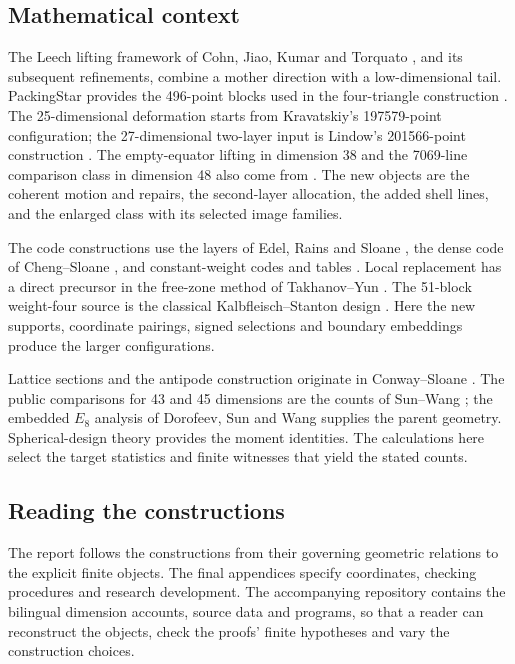 \subsection{Mathematical context}

The Leech lifting framework of Cohn, Jiao, Kumar and Torquato
\cite[Theorem 7.5]{cjkt}, and its subsequent refinements, combine a
mother direction with a low-dimensional tail. PackingStar provides
the 496-point blocks used in the four-triangle construction
\cite{packingstar,packingstar-data}. The 25-dimensional deformation
starts from Kravatskiy's 197579-point configuration; the 27-dimensional
two-layer input is Lindow's 201566-point construction
\cite{kissingnumbers,lindow27}. The empty-equator lifting in dimension 38
and the 7069-line comparison class in dimension 48 also come
from \cite{kissingnumbers}. The new objects are the coherent motion
and repairs, the second-layer allocation, the added shell lines,
and the enlarged class with its selected image families.

The code constructions use the layers of Edel, Rains and Sloane
\cite{ers}, the dense code of Cheng--Sloane \cite{chengsloane}, and
constant-weight codes and tables \cite{bsss,brouwer,echols}.
Local replacement has a direct precursor in the free-zone method of
Takhanov--Yun \cite[Section V]{signed-johnson}. The 51-block
weight-four source is the classical Kalbfleisch--Stanton design
\cite{kalbfleisch-stanton}. Here the new supports, coordinate
pairings, signed selections and boundary embeddings produce the
larger configurations.

Lattice sections and the antipode construction originate in
Conway--Sloane \cite{laminated,antipode}. The public comparisons for
43 and 45 dimensions are the counts of Sun--Wang
\cite{sunwang-sections,crosssections}; the embedded $E_8$ analysis
of Dorofeev, Sun and Wang \cite{dorofeev} supplies the parent geometry.
Spherical-design theory \cite{dgs,nebe-designs} provides the moment
identities. The calculations here select the target statistics and
finite witnesses that yield the stated counts.

\subsection{Reading the constructions}

The report follows the constructions from their governing geometric
relations to the explicit finite objects. The final appendices specify
coordinates, checking procedures and research development.
The accompanying repository contains the bilingual dimension accounts,
source data and programs, so that a reader can reconstruct the objects,
check the proofs' finite hypotheses and vary the construction choices.
